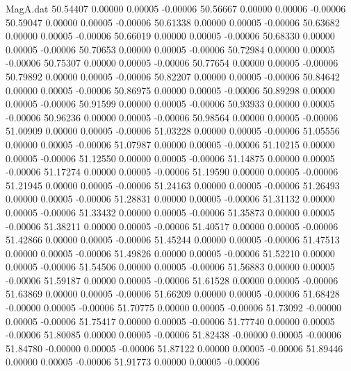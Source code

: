 \begin{filecontents}{MagA.dat}
  50.54407    0.00000    0.00005   -0.00006
  50.56667    0.00000    0.00006   -0.00006
  50.59047    0.00000    0.00005   -0.00006
  50.61338    0.00000    0.00005   -0.00006
  50.63682    0.00000    0.00005   -0.00006
  50.66019    0.00000    0.00005   -0.00006
  50.68330    0.00000    0.00005   -0.00006
  50.70653    0.00000    0.00005   -0.00006
  50.72984    0.00000    0.00005   -0.00006
  50.75307    0.00000    0.00005   -0.00006
  50.77654    0.00000    0.00005   -0.00006
  50.79892    0.00000    0.00005   -0.00006
  50.82207    0.00000    0.00005   -0.00006
  50.84642    0.00000    0.00005   -0.00006
  50.86975    0.00000    0.00005   -0.00006
  50.89298    0.00000    0.00005   -0.00006
  50.91599    0.00000    0.00005   -0.00006
  50.93933    0.00000    0.00005   -0.00006
  50.96236    0.00000    0.00005   -0.00006
  50.98564    0.00000    0.00005   -0.00006
  51.00909    0.00000    0.00005   -0.00006
  51.03228    0.00000    0.00005   -0.00006
  51.05556    0.00000    0.00005   -0.00006
  51.07987    0.00000    0.00005   -0.00006
  51.10215    0.00000    0.00005   -0.00006
  51.12550    0.00000    0.00005   -0.00006
  51.14875    0.00000    0.00005   -0.00006
  51.17274    0.00000    0.00005   -0.00006
  51.19590    0.00000    0.00005   -0.00006
  51.21945    0.00000    0.00005   -0.00006
  51.24163    0.00000    0.00005   -0.00006
  51.26493    0.00000    0.00005   -0.00006
  51.28831    0.00000    0.00005   -0.00006
  51.31132    0.00000    0.00005   -0.00006
  51.33432    0.00000    0.00005   -0.00006
  51.35873    0.00000    0.00005   -0.00006
  51.38211    0.00000    0.00005   -0.00006
  51.40517    0.00000    0.00005   -0.00006
  51.42866    0.00000    0.00005   -0.00006
  51.45244    0.00000    0.00005   -0.00006
  51.47513    0.00000    0.00005   -0.00006
  51.49826    0.00000    0.00005   -0.00006
  51.52210    0.00000    0.00005   -0.00006
  51.54506    0.00000    0.00005   -0.00006
  51.56883    0.00000    0.00005   -0.00006
  51.59187    0.00000    0.00005   -0.00006
  51.61528    0.00000    0.00005   -0.00006
  51.63869    0.00000    0.00005   -0.00006
  51.66209    0.00000    0.00005   -0.00006
  51.68428   -0.00000    0.00005   -0.00006
  51.70775    0.00000    0.00005   -0.00006
  51.73092   -0.00000    0.00005   -0.00006
  51.75417    0.00000    0.00005   -0.00006
  51.77740    0.00000    0.00005   -0.00006
  51.80085    0.00000    0.00005   -0.00006
  51.82438   -0.00000    0.00005   -0.00006
  51.84780   -0.00000    0.00005   -0.00006
  51.87122    0.00000    0.00005   -0.00006
  51.89446    0.00000    0.00005   -0.00006
  51.91773    0.00000    0.00005   -0.00006

\end{filecontents}
